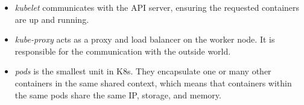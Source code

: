\begin{itemize}
	\item \textit{kubelet} communicates with the API server, ensuring the requested containers are up and running.
	\item \textit{kube-proxy} acts as a proxy and load balancer on the worker node. It is responsible for the communication with the outside world.
	\item \textit{pods} is the smallest unit in K8s. They encapsulate one or many other containers in the same shared context, which means that containers within the same pods share the same IP, storage, and memory.
\end{itemize}
